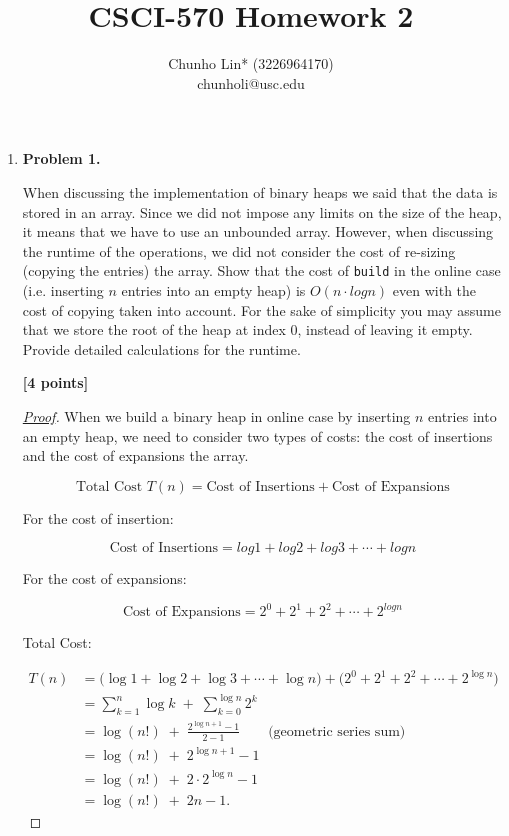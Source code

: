 \documentclass[11pt]{article}
\begin{document}
\author{Chunho Lin* (3226964170)\\chunholi@usc.edu}
\title{CSCI-570 Homework 2}
\maketitle

\medskip

\begin{enumerate}

\item \textbf{Problem 1.}

When discussing the implementation of binary heaps we said that the data is stored in an array. Since we did not impose any limits on the size of the heap, it means that we have to use an unbounded array. However, when discussing the runtime of the operations, we did not consider the cost of re-sizing (copying the entries) the array. Show that the cost of \texttt{build} in the online case (i.e. inserting \(n\) entries into an empty heap) is \(O(n \cdot log n)\) even with the cost of copying taken into account. For the sake of simplicity you may assume that we store the root of the heap at index 0, instead of leaving it empty. Provide detailed calculations for the runtime.

\begin{flushright}
\end{flushright}

\begin{flushright}
\textbf{[4 points]}
\end{flushright}

\begin{proof}[\underline{Proof}]

When we build a binary heap in online case by inserting \(n\) entries into an empty heap, we need to consider two types of costs: the cost of insertions and the cost of expansions the array.

\[
\text{Total Cost } T(n) = \text{Cost of Insertions} + \text{Cost of Expansions}
\]

For the cost of insertion:

\[
\text{Cost of Insertions} = log 1 + log 2 + log 3 + \cdots + log n
\]

For the cost of expansions:

\[
\text{Cost of Expansions} = 2^0 + 2^1 + 2^2 + \cdots + 2^{log n}
\]


Total Cost:

\[
\begin{aligned}
T(n)
&= \bigl(\log 1 + \log 2 + \log 3 + \cdots + \log n \bigr) 
   + \bigl(2^0 + 2^1 + 2^2 + \cdots + 2^{\log n}\bigr) \\[6pt]
&= \sum_{k=1}^{n} \log k \;+\; \sum_{k=0}^{\log n} 2^k \\[6pt]
&= \log(n!) \;+\; \frac{2^{\log n + 1} - 1}{2 - 1} 
   \qquad \text{(geometric series sum)} \\[6pt]
&= \log(n!) \;+\; 2^{\log n + 1} - 1 \\[6pt]
&= \log(n!) \;+\; 2 \cdot 2^{\log n} - 1 \\[6pt]
&= \log(n!) \;+\; 2n - 1. 
\end{aligned}
\]


\end{proof}
\end{enumerate}
\end{document}
